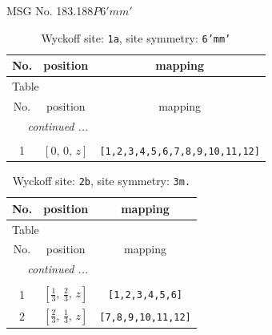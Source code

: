 \documentclass[fleqn,8pt]{jsarticle}
\begin{document}
\setcounter{MaxMatrixCols}{32}

\renewcommand{\tablename}{Table~}
\renewcommand{\figurename}{Figure~}
\begin{center}
\LARGE
MSG No. 183.188\quad$P6'mm'$
\end{center}
\renewcommand{\arraystretch}{1.2}
\begin{longtable}{ccc}
\caption{Wyckoff site: {\tt 1a}, site symmetry: {\tt 6'mm'}}
 \\
 \hline \hline
No. & position & mapping \\ \hline \endfirsthead

\multicolumn{2}{l}{\tablename\ \thetable{}} \\
 \hline \hline
No. & position & mapping \\ \hline \endhead

 \hline \hline
\multicolumn{2}{r}{\footnotesize\it continued ...} \\ \endfoot

 \hline \hline
\multicolumn{2}{r}{} \\ \endlastfoot

1 & $\left[ 0,\, 0,\, z \right]$ & {\tt [1,2,3,4,5,6,7,8,9,10,11,12]} \\
\end{longtable}
\renewcommand{\arraystretch}{1.2}
\begin{longtable}{ccc}
\caption{Wyckoff site: {\tt 2b}, site symmetry: {\tt 3m.}}
 \\
 \hline \hline
No. & position & mapping \\ \hline \endfirsthead

\multicolumn{2}{l}{\tablename\ \thetable{}} \\
 \hline \hline
No. & position & mapping \\ \hline \endhead

 \hline \hline
\multicolumn{2}{r}{\footnotesize\it continued ...} \\ \endfoot

 \hline \hline
\multicolumn{2}{r}{} \\ \endlastfoot

1 & $\left[ \frac{1}{3},\, \frac{2}{3},\, z \right]$ & {\tt [1,2,3,4,5,6]} \\ \hline
2 & $\left[ \frac{2}{3},\, \frac{1}{3},\, z \right]$ & {\tt [7,8,9,10,11,12]} \\
\end{longtable}
\renewcommand{\arraystretch}{1.2}
\end{document}
